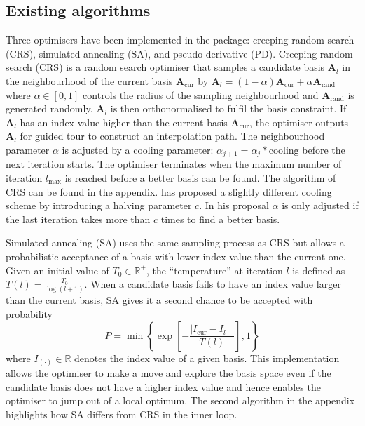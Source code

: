\hypertarget{existing-algorithms}{%
\subsection{Existing algorithms}\label{existing-algorithms}}

Three optimisers have been implemented in the  \citep{tourr}
package: creeping random search (CRS), simulated annealing (SA), and
pseudo-derivative (PD). Creeping random search (CRS) is a random search
optimiser that samples a candidate basis \(\mathbf{A}_{l}\) in the
neighbourhood of the current basis \(\mathbf{A}_{\text{cur}}\) by
\(\mathbf{A}_{l} = (1- \alpha)\mathbf{A}_{\text{cur}} + \alpha \mathbf{A}_{\text{rand}}\)
where \(\alpha \in [0,1]\) controls the radius of the sampling
neighbourhood and \(\mathbf{A}_{\text{rand}}\) is generated randomly.
\(\mathbf{A}_{l}\) is then orthonormalised to fulfil the basis
constraint. If \(\mathbf{A}_{l}\) has an index value higher than the
current basis \(\mathbf{A}_{\text{cur}}\), the optimiser outputs
\(\mathbf{A}_{l}\) for guided tour to construct an interpolation path.
The neighbourhood parameter \(\alpha\) is adjusted by a cooling
parameter: \(\alpha_{j+1} = \alpha_j * \text{cooling}\) before the next
iteration starts. The optimiser terminates when the maximum number of
iteration \(l_{\max}\) is reached before a better basis can be found.
The algorithm of CRS can be found in the appendix.
\citet{posse1995projection} has proposed a slightly different cooling
scheme by introducing a halving parameter \(c\). In his proposal
\(\alpha\) is only adjusted if the last iteration takes more than \(c\)
times to find a better basis.

Simulated annealing (SA) uses the same sampling process as CRS but
allows a probabilistic acceptance of a basis with lower index value than
the current one. Given an initial value of \(T_0 \in \mathbb{R^{+}}\),
the ``temperature'' at iteration \(l\) is defined as
\(T(l) = \frac{T_0}{\log(l + 1)}\). When a candidate basis fails to have
an index value larger than the current basis, SA gives it a second
chance to be accepted with probability
\[P= \min\left\{\exp\left[-\frac{\mid I_{\text{cur}} - I_{l} \mid}{T(l)}\right],1\right\}\]
where \(I_{(\cdot)} \in \mathbb{R}\) denotes the index value of a given
basis. This implementation allows the optimiser to make a move and
explore the basis space even if the candidate basis does not have a
higher index value and hence enables the optimiser to jump out of a
local optimum. The second algorithm in the appendix highlights how SA
differs from CRS in the inner loop.

